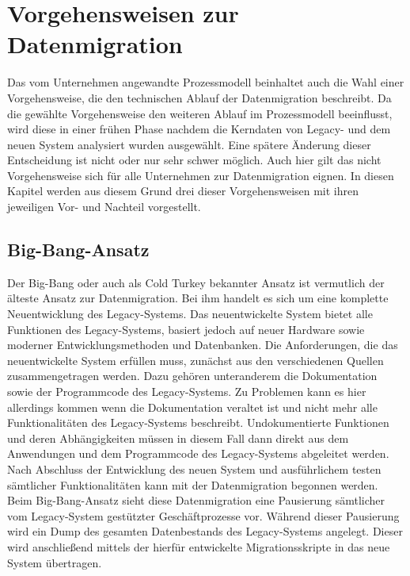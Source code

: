\section{Vorgehensweisen zur Datenmigration}
\label{chapter:vorgehensweisen}


Das vom Unternehmen angewandte Prozessmodell beinhaltet auch die Wahl einer Vorgehensweise, die den technischen Ablauf der Datenmigration beschreibt. Da die gewählte Vorgehensweise den weiteren Ablauf im Prozessmodell beeinflusst, wird diese in einer frühen Phase nachdem die Kerndaten von Legacy- und dem neuen System analysiert wurden ausgewählt. Eine spätere Änderung dieser Entscheidung ist nicht oder nur sehr schwer möglich. Auch hier gilt das nicht Vorgehensweise sich für alle Unternehmen zur Datenmigration eignen. In diesen Kapitel werden aus diesem Grund drei dieser Vorgehensweisen mit ihren jeweiligen Vor- und Nachteil vorgestellt. 

\subsection{Big-Bang-Ansatz}

Der Big-Bang oder auch als Cold Turkey bekannter Ansatz ist vermutlich der älteste Ansatz zur Datenmigration. Bei ihm handelt es sich um eine komplette Neuentwicklung des Legacy-Systems. Das neuentwickelte System bietet alle Funktionen des Legacy-Systems, basiert jedoch auf neuer Hardware sowie moderner Entwicklungsmethoden und Datenbanken.\citep[S. 105]{bisbal-1999}
\lb
Die Anforderungen, die das neuentwickelte System erfüllen muss, zunächst aus den verschiedenen Quellen zusammengetragen werden. Dazu gehören unteranderem die Dokumentation sowie der Programmcode des Legacy-Systems.\citep[S. 2]{brodie-1993} Zu Problemen kann es hier allerdings kommen wenn die Dokumentation veraltet ist und nicht mehr alle Funktionalitäten des Legacy-Systems beschreibt. Undokumentierte Funktionen und deren Abhängigkeiten müssen in diesem Fall dann direkt aus dem Anwendungen und dem Programmcode des Legacy-Systems abgeleitet werden.\citep[S. 2]{brodie-1993} 
\lb
Nach Abschluss der Entwicklung des neuen System und ausführlichem testen sämtlicher Funktionalitäten kann mit der Datenmigration begonnen werden. Beim Big-Bang-Ansatz sieht diese Datenmigration eine Pausierung sämtlicher vom Legacy-System gestützter Geschäftprozesse vor.\citep[S. 4]{wuLawless-1997} Während dieser Pausierung wird ein Dump des gesamten Datenbestands des Legacy-Systems angelegt. Dieser wird anschließend mittels der hierfür entwickelte Migrationsskripte in das neue System übertragen.

